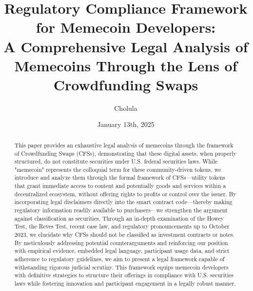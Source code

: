 \documentclass[a4paper,12pt]{article}
\begin{document}
\title{Regulatory Compliance Framework for Memecoin Developers:\\ A Comprehensive Legal Analysis of Memecoins Through the Lens of Crowdfunding Swaps}
\author{Cholula}
\date{January 13th, 2025}
\maketitle
\begin{abstract}
This paper provides an exhaustive legal analysis of memecoins through the framework of Crowdfunding Swaps (CFSs), demonstrating that these digital assets, when properly structured, do not constitute securities under U.S. federal securities laws. While "memecoin" represents the colloquial term for these community-driven tokens, we introduce and analyze them through the formal framework of CFSs—utility tokens that grant immediate access to content and potentially goods and services within a decentralized ecosystem, without offering rights to profits or control over the issuer. By incorporating legal disclaimers directly into the smart contract code—thereby making regulatory information readily available to purchasers—we strengthen the argument against classification as securities. Through an in-depth examination of the Howey Test, the Reves Test, recent case law, and regulatory pronouncements up to October 2023, we elucidate why CFSs should not be classified as investment contracts or notes. By meticulously addressing potential counterarguments and reinforcing our position with empirical evidence, embedded legal language, participant usage data, and strict adherence to regulatory guidelines, we aim to present a legal framework capable of withstanding rigorous judicial scrutiny. This framework equips memecoin developers with definitive strategies to structure their offerings in compliance with U.S. securities laws while fostering innovation and participant engagement in a legally robust manner.
\end{abstract}
\end{document}

